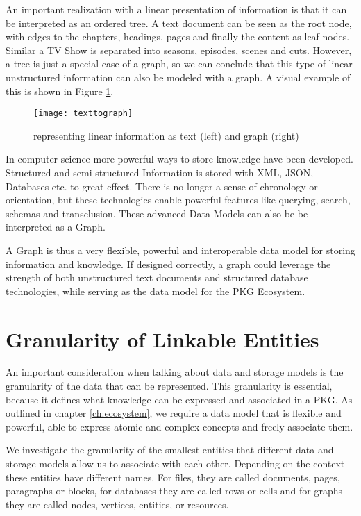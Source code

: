 An important realization with a linear presentation of information is that it can be interpreted as an ordered tree. A text document can be seen as the root node, with edges to the chapters, headings, pages and finally the content as leaf nodes. Similar a TV Show is separated into seasons, episodes, scenes and cuts. However, a tree is just a special case of a graph, so we can conclude that this type of linear unstructured information can also be modeled with a graph. A visual example of this is shown in Figure \ref{fig:treetograph}.

\begin{figure}[h]
\centering
\texttt{[image: texttograph]}
\caption{representing linear information as text (left) and graph (right)}
\label{fig:treetograph}
\end{figure}

In computer science more powerful ways to store knowledge have been developed. Structured and semi-structured Information is stored with XML, JSON, Databases etc. to great effect. There is no longer a sense of chronology or orientation, but these technologies enable powerful features like querying, search, schemas and transclusion. These advanced Data Models can also be be interpreted as a Graph.

A Graph is thus a very flexible, powerful and interoperable data model for storing information and knowledge. If designed correctly, a graph could leverage the strength of both unstructured text documents and structured database technologies, while serving as the data model for the PKG Ecosystem.

\section{Granularity of Linkable Entities}

An important consideration when talking about data and storage models is the granularity of the data that can be represented. This granularity is essential, because it defines what knowledge can be expressed and associated in a PKG. As outlined in chapter \ref{ch:ecosystem}, we require a data model that is flexible and powerful, able to express atomic and complex concepts and freely associate them.

We investigate the granularity of the smallest entities that different data and storage models allow us to associate with each other. Depending on the context these entities have different names. For files, they are called documents, pages, paragraphs or blocks, for databases they are called rows or cells and for graphs they are called nodes, vertices, entities, or resources.

